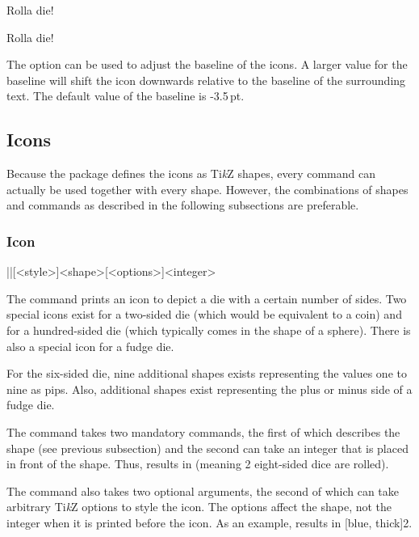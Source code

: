 \documentclass[a4paper]{article}
\begin{document}
\begin{codeexample}
Rolla die!

Rolla die!
\end{codeexample}

The option  can be used to adjust the baseline of the icons. A larger value for the baseline will shift the icon downwards relative to the baseline of the surrounding text. The default value of the baseline is -3.5\,pt.

\subsection{Icons}

Because the package defines the icons as Ti\emph{k}Z shapes, every command can actually be used together with every shape. However, the combinations of shapes and commands as described in the following subsections are preferable.

\subsubsection[Icon \textbackslash die]{Icon }

\begin{macrodef}|\die|[<style>]{<shape>}[<options>]{<integer>}\end{macrodef}
The command \macro{\die} prints an icon to depict a die with a certain number of sides. Two special icons exist for a two-sided die (which would be equivalent to a coin) and for a hundred-sided die (which typically comes in the shape of a sphere). There is also a special icon for a fudge die. 

For the six-sided die, nine additional shapes exists representing the values one to nine as pips. Also, additional shapes exist representing the plus or minus side of a fudge die.

The command takes two mandatory commands, the first of which describes the shape (see previous subsection) and the second can take an integer that is placed in front of the shape. Thus,  results in  (meaning 2 eight-sided dice are rolled).

The command also takes two optional arguments, the second of which can take arbitrary Ti\emph{k}Z options to style the icon. The options affect the shape, not the integer when it is printed before the icon. As an example,  results in [blue, thick]{2}.
\end{document}
